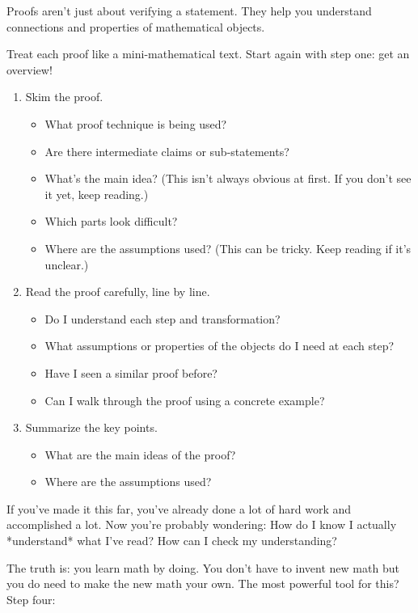 \documentclass[paper=a4, fontsize=12pt]{scrartcl} %
\begin{document}
Proofs aren’t just about verifying a statement. They help you understand connections and properties of mathematical objects.

Treat each proof like a mini-mathematical text. Start again with step one: get an overview!

\begin{enumerate}[label=\alph*]
\item Skim the proof.
\begin{itemize}
	\item What proof technique is being used?
	\item Are there intermediate claims or sub-statements?
	\item What’s the main idea? (This isn’t always obvious at first. If you don’t see it yet, keep reading.)
	\item Which parts look difficult?
	\item Where are the assumptions used? (This can be tricky. Keep reading if it’s unclear.)
\end{itemize}

\item Read the proof carefully, line by line.
\begin{itemize}
	\item Do I understand each step and transformation?
	\item What assumptions or properties of the objects do I need at each step?
	\item Have I seen a similar proof before?
	\item Can I walk through the proof using a concrete example?
\end{itemize}
\item Summarize the key points.
\begin{itemize}
	\item What are the main ideas of the proof?
	\item Where are the assumptions used?
\end{itemize} 	
\end{enumerate}

\bigskip

If you’ve made it this far, you’ve already done a lot of hard work and accomplished a lot. Now you’re probably wondering: How do I know I actually *understand* what I’ve read? How can I check my understanding?

The truth is: you learn math by doing. You don’t have to invent new math but you do need to make the new math your own. The most powerful tool for this? Step four:
\end{document}
